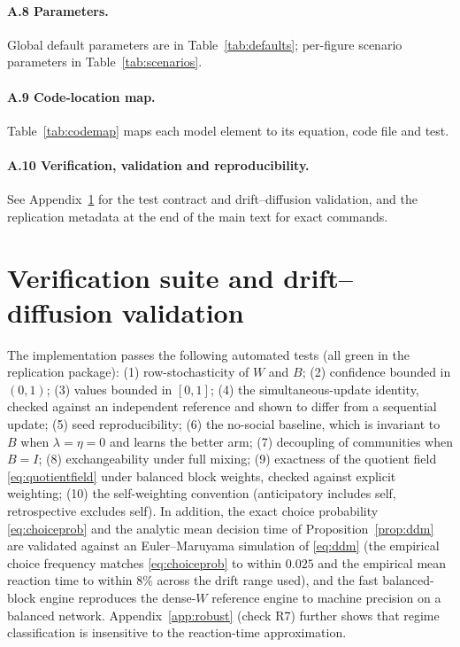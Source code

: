 \documentclass[11pt]{article}
\newcommand{\1}{\mathbf{1}}
\begin{document}
\paragraph{A.8 Parameters.}
Global default parameters are in Table~\ref{tab:defaults}; per-figure scenario
parameters in Table~\ref{tab:scenarios}.

\paragraph{A.9 Code-location map.}
Table~\ref{tab:codemap} maps each model element to its equation, code file and
test.

\paragraph{A.10 Verification, validation and reproducibility.}
See Appendix~\ref{app:tests} for the test contract and drift--diffusion
validation, and the replication metadata at the end of the main text for exact
commands.

\section{Verification suite and drift--diffusion validation}
\label{app:tests}
The implementation passes the following automated tests (all green in the
replication package): (1) row-stochasticity of $W$ and $B$; (2) confidence
bounded in $(0,1)$; (3) values bounded in $[0,1]$; (4) the simultaneous-update
identity, checked against an independent reference and shown to differ from a
sequential update; (5) seed reproducibility; (6) the no-social baseline, which
is invariant to $B$ when $\lambda=\eta=0$ and learns the better arm; (7)
decoupling of communities when $B=I$; (8) exchangeability under full mixing;
(9) exactness of the quotient field \eqref{eq:quotientfield} under balanced
block weights, checked against explicit weighting; (10) the self-weighting
convention (anticipatory includes self, retrospective excludes self). In
addition, the exact choice probability \eqref{eq:choiceprob} and the analytic
mean decision time of Proposition~\ref{prop:ddm} are validated against an
Euler--Maruyama simulation of \eqref{eq:ddm} (the empirical choice frequency
matches \eqref{eq:choiceprob} to within $0.025$ and the empirical mean reaction
time to within $8\%$ across the drift range used), and the fast balanced-block
engine reproduces the dense-$W$ reference engine to machine precision on a
balanced network. Appendix~\ref{app:robust} (check R7) further shows that regime
classification is insensitive to the reaction-time approximation.
\end{document}
